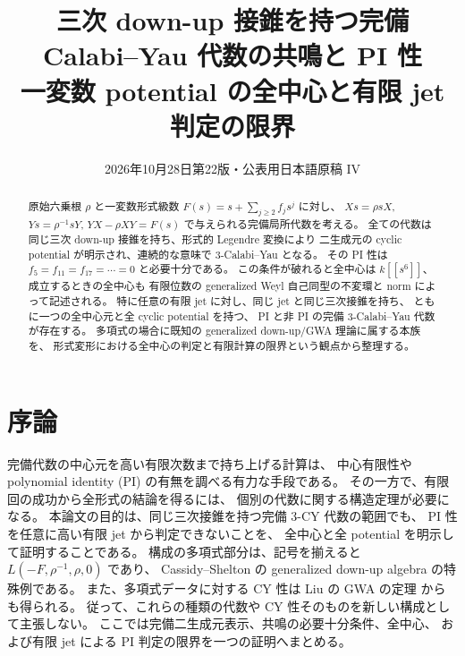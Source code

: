 
\title{三次 down-up 接錐を持つ完備 Calabi--Yau 代数の共鳴と PI 性\\[.4em]
\large 一変数 potential の全中心と有限 jet 判定の限界}
\author{}
\date{2026年10月28日\quad 第22版・公表用日本語原稿 IV}

\maketitle
\begin{abstract}
原始六乗根 $\rho$ と一変数形式級数 $F(s)=s+\sum_{j\ge2}f_js^j$ に対し、
$Xs=\rho sX$, $Ys=\rho^{-1}sY$, $YX-\rho XY=F(s)$ で与えられる完備局所代数を考える。
全ての代数は同じ三次 down-up 接錐を持ち、形式的 Legendre 変換により
二生成元の cyclic potential が明示され、連続的な意味で $3$-Calabi--Yau となる。
その PI 性は $f_5=f_{11}=f_{17}=\cdots=0$ と必要十分である。
この条件が破れると全中心は $k[[s^6]]$、成立するときの全中心も
有限位数の generalized Weyl 自己同型の不変環と norm によって記述される。
特に任意の有限 jet に対し、同じ jet と同じ三次接錐を持ち、
ともに一つの全中心元と全 cyclic potential を持つ、
PI と非 PI の完備 $3$-Calabi--Yau 代数が存在する。
多項式の場合に既知の generalized down-up/GWA 理論に属する本族を、
形式変形における全中心の判定と有限計算の限界という観点から整理する。
\end{abstract}
\tableofcontents
\medskip
\section{序論}
\label{sec:resonant-cy-pi-v22}

完備代数の中心元を高い有限次数まで持ち上げる計算は、
中心有限性や polynomial identity (PI) の有無を調べる有力な手段である。
その一方で、有限回の成功から全形式の結論を得るには、
個別の代数に関する構造定理が必要になる。
本論文の目的は、同じ三次接錐を持つ完備 $3$-CY 代数の範囲でも、
PI 性を任意に高い有限 jet から判定できないことを、
全中心と全 potential を明示して証明することである。
構成の多項式部分は、記号を揃えると $L(-F,\rho^{-1},\rho,0)$ であり、
Cassidy--Shelton の generalized down-up algebra
\cite{CassidySheltonGeneralizedDownUpV22} の特殊例である。
また、多項式データに対する CY 性は Liu の GWA の定理
\cite[Theorems 1.1--1.2]{LiuGWASmoothV22}からも得られる。
従って、これらの種類の代数や CY 性そのものを新しい構成として主張しない。
ここでは完備二生成元表示、共鳴の必要十分条件、全中心、
および有限 jet による PI 判定の限界を一つの証明へまとめる。

